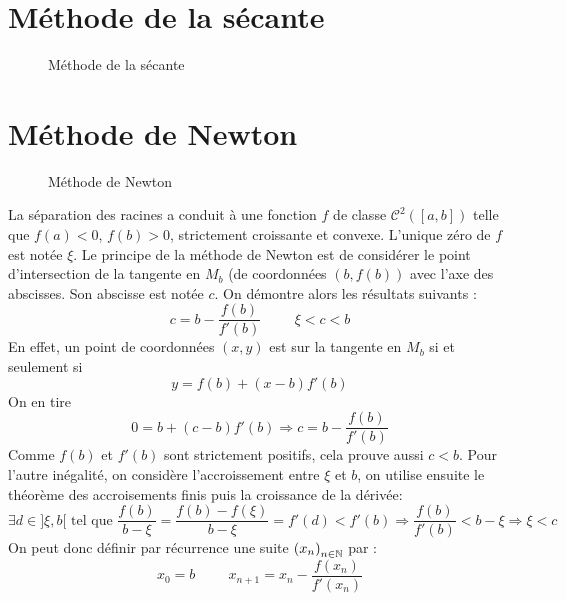 \section{Méthode de la sécante}
\begin{figure}[ht]
 \centering

\caption{Méthode de la sécante}
\label{fig:C2195_3}
\end{figure} 

\section{Méthode de Newton}
\begin{figure}[ht]
 \centering

\caption{Méthode de Newton}
\label{fig:C2195_2}
\end{figure} 
La séparation des racines a conduit à une fonction $f$ de classe $\mathcal C^2([a,b])$ telle que $f(a)<0$, $f(b)>0$, strictement croissante et convexe. L'unique zéro de $f$ est notée $\xi$.\newline
Le principe de la méthode de Newton est de considérer le point d'intersection de la tangente en $M_b$ (de coordonnées $(b,f(b))$ avec l'axe des abscisses. Son abscisse est notée $c$. On démontre alors les résultats suivants :
\begin{displaymath}
 c = b - \frac{f(b)}{f'(b)} \hspace{1cm} \xi < c < b
\end{displaymath}
En effet, un point de coordonnées $(x,y)$ est sur la tangente en $M_b$ si et seulement si
\begin{displaymath}
 y = f(b) +(x-b)f'(b)
\end{displaymath}
On en tire
\begin{displaymath}
 0 = b+ (c-b)f'(b) \Rightarrow c = b - \frac{f(b)}{f'(b)}
\end{displaymath}
Comme $f(b)$ et $f'(b)$ sont strictement positifs, cela prouve aussi $c<b$. Pour l'autre inégalité, on considère l'accroissement entre $\xi$ et $b$, on utilise ensuite le théorème des accroisements finis puis la  croissance de la dérivée:
\begin{displaymath}
 \exists d\in ]\xi,b[ \text{ tel que }
\frac{f(b)}{b-\xi}=\frac{f(b)-f(\xi)}{b-\xi}=f'(d)< f'(b)
\Rightarrow \frac{f(b)}{f'(b)}<b-\xi \Rightarrow \xi < c
\end{displaymath}
On peut donc définir par récurrence une suite $\left(x_n \right)_{n\in\mathbb{N}}$ par :
\begin{displaymath}
 x_0=b\hspace{1cm} x_{n+1} = x_n-\frac{f(x_n)}{f'(x_n)}
\end{displaymath}
